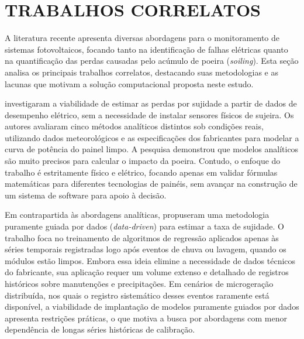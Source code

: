 \documentclass{UNESC}
\begin{document}
\section{TRABALHOS CORRELATOS}




A literatura recente apresenta diversas abordagens para o monitoramento de sistemas fotovoltaicos, focando tanto na identificação de falhas elétricas quanto na quantificação das perdas causadas pelo acúmulo de poeira (\textit{soiling}). Esta seção analisa os principais trabalhos correlatos, destacando suas metodologias e as lacunas que motivam a solução computacional proposta neste estudo.

 investigaram a viabilidade de estimar as perdas por sujidade a partir de dados de desempenho elétrico, sem a necessidade de instalar sensores físicos de sujeira. Os autores avaliaram cinco métodos analíticos distintos sob condições reais, utilizando dados meteorológicos e as especificações dos fabricantes para modelar a curva de potência do painel limpo. A pesquisa demonstrou que modelos analíticos são muito precisos para calcular o impacto da poeira. Contudo, o enfoque do trabalho é estritamente físico e elétrico, focando apenas em validar fórmulas matemáticas para diferentes tecnologias de painéis, sem avançar na construção de um sistema de software para apoio à decisão.

Em contrapartida às abordagens analíticas,  propuseram uma metodologia puramente guiada por dados (\textit{data-driven}) para estimar a taxa de sujidade. O trabalho foca no treinamento de algoritmos de regressão aplicados apenas às séries temporais registradas logo após eventos de chuva ou lavagem, quando os módulos estão limpos. Embora essa ideia elimine a necessidade de dados técnicos do fabricante, sua aplicação requer um volume extenso e detalhado de registros históricos sobre manutenções e precipitações. Em cenários de microgeração distribuída, nos quais o registro sistemático desses eventos raramente está disponível, a viabilidade de implantação de modelos puramente guiados por dados apresenta restrições práticas, o que motiva a busca por abordagens com menor dependência de longas séries históricas de calibração.
\end{document}
